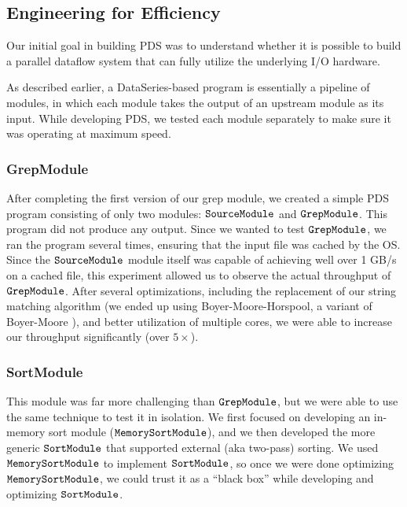 \documentclass[ 11pt, letterpaper]{article}%
\begin{document}
\subsection{Engineering for Efficiency}

Our initial goal in building PDS was to understand whether it is possible to
build a parallel dataflow system that can fully utilize the underlying I/O
hardware.

As described earlier, a DataSeries-based program is essentially a pipeline of
modules, in which each module takes the output of an upstream module as its
input. While developing PDS, we tested each module separately to make sure it
was operating at maximum speed.

\subsubsection{GrepModule}

After completing the first version of our grep
  module, we created a simple PDS program consisting of only two modules: $\tt
  SourceModule$ and $\tt GrepModule$. This program did not produce any output.
  Since we wanted to test $\tt GrepModule$, we ran the program several times,
  ensuring that the input file was cached by the OS. Since the $\tt
  SourceModule$ module itself was capable of achieving well over 1 GB/s on a
  cached file, this experiment allowed us to observe the actual throughput of
  $\tt GrepModule$. After several optimizations, including the replacement of
  our string matching algorithm (we ended up using Boyer-Moore-Horspool, a
  variant of Boyer-Moore \cite{boyermoore}), and better utilization of multiple
  cores, we were able to increase our throughput significantly (over $5
  \times$).
  
\subsubsection{SortModule}

This module was far more challenging than $\tt
  GrepModule$, but we were able to use the same technique to test it in
  isolation. We first focused on developing an in-memory sort module ($\tt
  MemorySortModule$), and we then developed the more generic $\tt SortModule$
  that supported external (aka two-pass) sorting. We used $\tt MemorySortModule$
  to implement $\tt SortModule$, so once we were done optimizing $\tt
  MemorySortModule$, we could trust it as a ``black box'' while developing and
  optimizing $\tt SortModule$.
  
\end{document}
